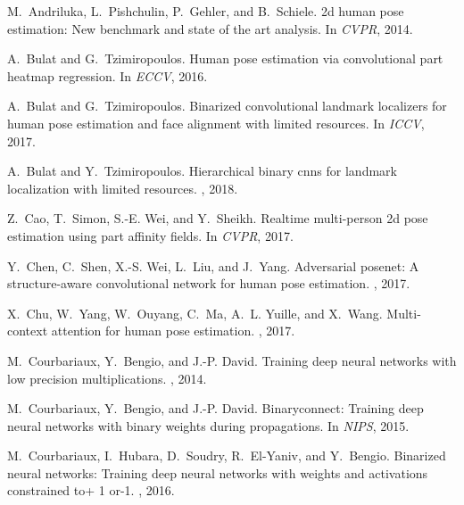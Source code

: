 \documentclass[10pt,twocolumn,letterpaper]{article}
\begin{document}
{\small

\begin{thebibliography}{10}\itemsep=-1pt

M.~Andriluka, L.~Pishchulin, P.~Gehler, and B.~Schiele.
\newblock 2d human pose estimation: New benchmark and state of the art
  analysis.
\newblock In {\em CVPR}, 2014.

A.~Bulat and G.~Tzimiropoulos.
\newblock Human pose estimation via convolutional part heatmap regression.
\newblock In {\em ECCV}, 2016.

A.~Bulat and G.~Tzimiropoulos.
\newblock Binarized convolutional landmark localizers for human pose estimation
  and face alignment with limited resources.
\newblock In {\em ICCV}, 2017.

A.~Bulat and Y.~Tzimiropoulos.
\newblock Hierarchical binary cnns for landmark localization with limited
  resources.
,
  2018.

Z.~Cao, T.~Simon, S.-E. Wei, and Y.~Sheikh.
\newblock Realtime multi-person 2d pose estimation using part affinity fields.
\newblock In {\em CVPR}, 2017.

Y.~Chen, C.~Shen, X.-S. Wei, L.~Liu, and J.~Yang.
\newblock Adversarial posenet: A structure-aware convolutional network for
  human pose estimation.
, 2017.

X.~Chu, W.~Yang, W.~Ouyang, C.~Ma, A.~L. Yuille, and X.~Wang.
\newblock Multi-context attention for human pose estimation.
, 2017.

M.~Courbariaux, Y.~Bengio, and J.-P. David.
\newblock Training deep neural networks with low precision multiplications.
, 2014.

M.~Courbariaux, Y.~Bengio, and J.-P. David.
\newblock Binaryconnect: Training deep neural networks with binary weights
  during propagations.
\newblock In {\em NIPS}, 2015.

M.~Courbariaux, I.~Hubara, D.~Soudry, R.~El-Yaniv, and Y.~Bengio.
\newblock Binarized neural networks: Training deep neural networks with weights
  and activations constrained to+ 1 or-1.
, 2016.


\end{thebibliography}}
\end{document}
